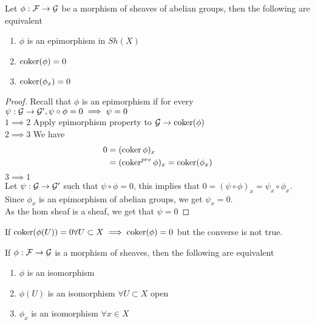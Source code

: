 \documentclass[../main.tex]{subfiles}
\begin{document}
\begin{propo}
Let $\phi: \mathcal{F}\to \mathcal{G}$ be a morphism of sheaves of abelian groups, then the following are equivalent
\begin{enumerate}
\item $\phi$ is an epimorphism in $Sh( X) $ 
\item $\operatorname{coker} ( \phi) =0$ 
\item $\operatorname{coker}( \phi_x) =0$ 
\end{enumerate}
\end{propo}
\begin{proof}
Recall that $\phi$ is an epimorphism if for every $\psi:\mathcal{G}\to \mathcal{G}', \psi\circ\phi = 0 \implies \psi =0$ \\
$1\implies 2 $ Apply epimorphism property to $\mathcal{G} \to \operatorname{coker}( \phi) $ \\
$2\implies 3$ We have
\begin{align*}
0 &= ( \operatorname{coker} \phi)_x\\
&= ( \operatorname{coker}^{pre}\phi) _x = \operatorname{coker} ( \phi_x) 
\end{align*}
$3 \implies 1$ \\
Let $\psi: \mathcal{G} \to \mathcal{G}'$ such that $\psi\circ\phi=0$, this implies that $0 = ( \psi\circ\phi)_x = \psi_x \circ\phi_x$.\\
Since $\phi_x$ is an epimorphism of abelian groups, we get $\psi_x=0$.\\
As the hom sheaf is a sheaf, we get that $\psi =0$ 

\end{proof}
\begin{rmq}
If $\operatorname{coker}( \phi( U) ) =0 \forall U \subset X\implies \operatorname{coker}( \phi) =0$ but the converse is not true.
\end{rmq}
\begin{crly}
If $\phi:\mathcal{F}\to \mathcal{G}$ is a morphism of sheaves, then the following are equivalent
\begin{enumerate}
\item $\phi$ is an isomorphism
\item $\phi( U) $ is an isomorphism $\forall U \subset X$ open
\item $\phi_x$ is an isomorphism $\forall x \in X$ 
\end{enumerate}
\end{crly}
\end{document}
